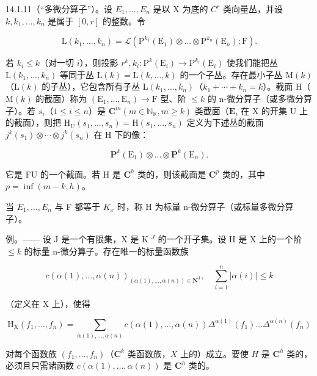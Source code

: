 14.1.11（“多微分算子”）。设 \(E_{1}, \ldots, E_{n}\) 是以 X 为底的 \(C^{r}\) 类向量丛，并设 \(k, k_{1}, \ldots, k_{n}\) 是属于 \([0, r]\) 的整数。令

\[
\mathrm{L} (k _ {1}, \dots , k _ {n}) = \mathscr {L} (\mathrm{P} ^ {k _ {1}} (\mathrm{E} _ {1}) \otimes \dots \otimes \mathrm{P} ^ {k _ {n}} (\mathrm{E} _ {n}); \mathrm{F}).
\]

若 \(k_i \leqslant k\)（对一切 \(i\)），则投影 \(r^k, k_i: \mathrm{P}^k(\mathrm{E}_i) \to \mathrm{P}^{k_i}(\mathrm{E}_i)\) 使我们能把丛 \(\mathrm{L}(k_1, \ldots, k_n)\) 等同于丛 \(\mathrm{L}(k) = \mathrm{L}(k, \ldots, k)\) 的一个子丛。存在最小子丛 \(\mathrm{M}(k)\)（\(\mathrm{L}(k)\) 的子丛），它包含所有子丛 \(\mathrm{L}(k_1, \ldots, k_n)\)（\(k_1 + \cdots + k_n = k\)）。截面 \(\mathrm{H}\)（\(\mathrm{M}(k)\) 的截面）称为 \((\mathrm{E}_1, \ldots, \mathrm{E}_n) \to \mathrm{F}\) 型、阶 \(\leqslant k\) 的 n-微分算子（或多微分算子）。若 \(s_i\)（\(1 \leqslant i \leqslant n\)）是 \(\mathbf{C}^m (m \in \mathbb{N}_{\mathbb{K}}, m \geqslant k)\) 类截面（\(\mathbf{E}_i\) 在 X 的开集 U 上的截面），则把 \(\mathrm{H}_{\mathrm{U}}(s_1, \ldots, s_n) = \mathrm{H}(s_1, \ldots, s_n)\) 定义为下述丛的截面 \(j^k(s_1) \otimes \cdots \otimes j^k(s_n)\) 在 H 下的像：

\[
\mathbf {P} ^ {k} (\mathrm{E} _ {1}) \otimes \dots \otimes \mathbf {P} ^ {k} (\mathrm{E} _ {n}).
\]

它是 F\textbar U 的一个截面。若 H 是 \(\mathbf{C}^h\) 类的，则该截面是 \(\mathbf{C}^p\) 类的，其中 \(p = \inf(m - k, h)\)。

当 \(E_{1}, \ldots, E_{n}\) 与 F 都等于 \(K_{x}\) 时，称 H 为标量 n-微分算子（或标量多微分算子）。

例。—— 设 J 是一个有限集，X 是 K \(^{J}\) 的一个开子集。设 H 是 X 上的一个阶 \(\leqslant k\) 的标量 n-微分算子。存在唯一的标量函数族

\[
c (\alpha (1), \dots , \alpha (n)) _ {(\alpha (1), \dots , \alpha (n)) \in \mathbf {N} ^ {\mathrm{J}}}, \quad \sum_ {i = 1} ^ {n} | \alpha (i) | \leqslant k
\]

（定义在 X 上），使得

\[
\mathrm{H} _ {\mathrm{X}} \left(f _ {1}, \dots , f _ {n}\right) = \sum_ {\alpha (1), \dots , \alpha (n)} c (\alpha (1), \dots , \alpha (n)) \Delta^ {\alpha (1)} \left(f _ {1}\right) \dots \Delta^ {\alpha (n)} \left(f _ {n}\right)
\]

对每个函数族 \((f_1, \ldots, f_n)\)（\(\mathbf{C}^k\) 类函数族，\(X\) 上的）成立。要使 \(H\) 是 \(\mathbf{C}^h\) 类的，必须且只需诸函数 \(c(\alpha(1), \ldots, \alpha(n))\) 是 \(\mathbf{C}^h\) 类的。

